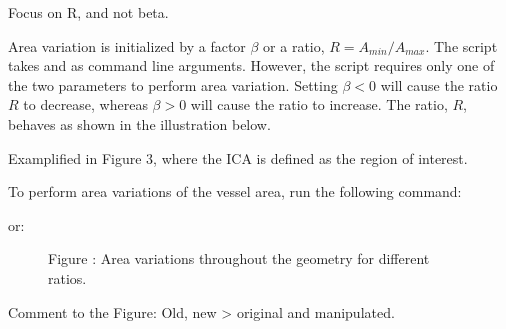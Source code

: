 \documentclass[letterpaper,10pt,english]{sphinxmanual}
\begin{document}
Focus on R, and not beta.

Area variation is initialized by a factor \(\beta\) or a ratio, \(R = A_{min} / A_{max}\).
The script takes  and  as command line arguments.
However, the script requires only one of the two parameters to perform area variation.
Setting \(\beta < 0\) will cause the ratio \(R\) to decrease,  whereas \(\beta > 0\) will cause the ratio to increase.
The ratio, \(R\), behaves as shown in the illustration below.

Examplified in Figure 3, where the ICA is defined as the region of interest.

To perform area variations of the vessel area, run the following command:

%
\begin{sphinxVerbatim}[commandchars=\\\{\}]
   \PYG{p}{[}\PYG{p}{]}  \PYG{p}{[}\PYG{p}{]}    
\end{sphinxVerbatim}

or:

%
\begin{sphinxVerbatim}[commandchars=\\\{\}]
   \PYG{p}{[}\PYG{p}{]}  \PYG{p}{[}\PYG{p}{]}    
\end{sphinxVerbatim}

\begin{figure}[htbp]
\centering
\capstart

\noindent{}
\caption{Figure : Area variations throughout the geometry for different ratios.}\label{\detokenize{getting_started:id7}}\end{figure}

Comment to the Figure: Old, new \textendash{}\textgreater{} original and manipulated.
\end{document}
